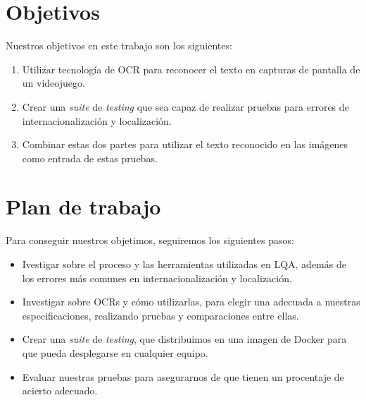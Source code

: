 \section{Objetivos}
Nuestros objetivos en este trabajo son los siguientes:
\begin{enumerate}
	\item Utilizar tecnología de OCR para reconocer el texto en capturas de pantalla de un videojuego.
	\item Crear una \textit{suite} de \textit{testing} que sea capaz de realizar pruebas para errores de internacionalización y localización.
	\item Combinar estas dos partes para utilizar el texto reconocido en las imágenes como entrada de estas pruebas.
\end{enumerate}


\section{Plan de trabajo}
Para conseguir nuestros objetimos, seguiremos los siguientes pasos:
\begin{itemize}
	\item Ivestigar sobre el proceso y las herramientas utilizadas en LQA, además de los errores más comunes en internacionalización y localización.
	\item Investigar sobre OCRs y cómo utilizarlas, para elegir una adecuada a nuestras especificaciones, realizando pruebas y comparaciones entre ellas.
	\item Crear una \textit{suite} de \textit{testing}, que distribuimos en una imagen de Docker para que pueda desplegarse en cualquier equipo.
	\item Evaluar nuestras pruebas para asegurarnos de que tienen un procentaje de acierto adecuado.
\end{itemize}




